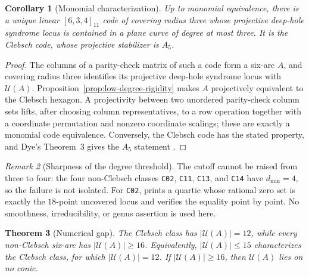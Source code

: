 \documentclass[11pt]{article}
\newtheorem{theorem}{Theorem}[section]
\newtheorem{corollary}[theorem]{Corollary}
\theoremstyle{remark}
\newtheorem{remark}[theorem]{Remark}
\newcommand{\cU}{\mathcal{U}}
\begin{document}
\begin{corollary}[Monomial characterization]
\label{cor:monomial-characterization}
Up to monomial equivalence, there is a unique linear $[6,3,4]_{11}$ code
of covering radius three whose projective deep-hole syndrome locus is
contained in a plane curve of degree at most three. It is the Clebsch code,
whose projective stabilizer is $A_5$.
\end{corollary}

\begin{proof}
The columns of a parity-check matrix of such a code form a six-arc $A$, and
covering radius three identifies its projective deep-hole syndrome locus
with $\cU(A)$. Proposition~\ref{prop:low-degree-rigidity} makes $A$
projectively equivalent to the Clebsch hexagon. A projectivity between two
unordered parity-check column sets lifts, after choosing column
representatives, to a row operation together with a coordinate permutation
and nonzero coordinate scalings; these are exactly a monomial code
equivalence. Conversely, the Clebsch code has the stated property, and
Dye's Theorem~3 gives the $A_5$ statement
\cite[p.~278]{Dye1991}.
\end{proof}

\begin{remark}[Sharpness of the degree threshold]
\label{rem:degree-threshold}
The cutoff cannot be raised from three to four: the four non-Clebsch
classes \texttt{C02}, \texttt{C11}, \texttt{C13}, and \texttt{C14} have
$d_{\min}=4$, so the failure is not isolated. For \texttt{C02},
 prints a quartic whose rational
zero set is exactly the $18$-point uncovered locus and verifies the equality
point by point. No smoothness, irreducibility, or genus assertion is used
here.
\end{remark}

\begin{theorem}[Numerical gap]
\label{thm:gap}
The Clebsch class has $|\cU(A)|=12$, while every non-Clebsch
six-arc has $|\cU(A)|\ge16$. Equivalently, $|\cU(A)|\le15$
characterizes the Clebsch class, for which $|\cU(A)|=12$.
If $|\cU(A)|\ge16$, then $\cU(A)$ lies on no conic.
\end{theorem}
\end{document}
